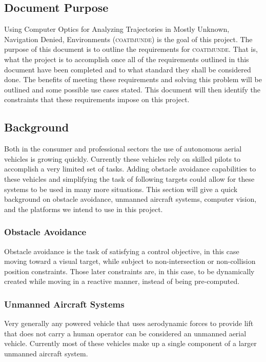 \documentclass{article}
\begin{document}
	\subsection{Document Purpose}
	
	Using Computer Optics for Analyzing Trajectories in Mostly Unknown, Navigation Denied, Environments (\textsc{coatimunde}) is the goal of this project. The purpose of this document is to outline the requirements for \textsc{coatimunde}. That is, what the project is to accomplish once all of the requirements outlined in this document have been completed and to what standard they shall be considered done. The benefits of meeting these requirements and solving this problem will be outlined and some possible use cases stated. This document will then identify the constraints that these requirements impose on this project.
	
	\subsection{Background}
	
	Both in the consumer and professional sectors the use of autonomous aerial vehicles is growing quickly. Currently these vehicles rely on skilled pilots to accomplish a very limited set of tasks. Adding obstacle avoidance capabilities to these vehicles and simplifying the task of following targets could allow for these systems to be used in many more situations. This section will give a quick background on obstacle avoidance, unmanned aircraft systems, computer vision, and the platforms we intend to use in this project.
	
		\subsubsection{Obstacle Avoidance}
		
		
		Obstacle avoidance is the task of satisfying a control objective, in this case moving toward a visual target, while subject to non-intersection or non-collision position constraints. Those later constraints are, in this case, to be dynamically created while moving in a reactive manner, instead of being pre-computed.
		
		\subsubsection{Unmanned Aircraft Systems}
		
		Very generally any powered vehicle that uses aerodynamic forces to provide lift that does not carry a human operator can be considered an unmanned aerial vehicle. Currently most of these vehicles make up a single component of a larger unmanned aircraft system. 
		
\end{document}
